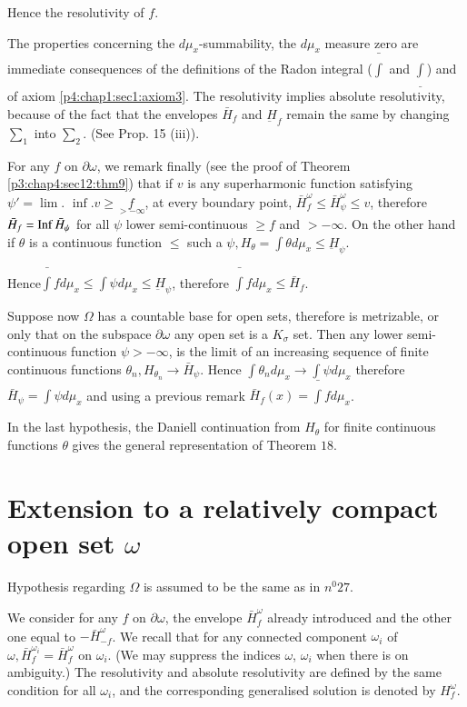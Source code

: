 Hence the resolutivity of $f$.

The properties concerning the $d \mu _x$-summability, the $d \mu_x$
measure zero are immediate consequences of the definitions of the
Radon integral ($\bar{\int}$ and $\underline\int$) and of axiom
\ref{p4:chap1:sec1:axiom3}. The resolutivity implies absolute resolutivity, because of the
fact that the envelopes $\bar{H}_f$ and $\underbar{H}_f$ remain the
same by changing $\sum_1$ into $\sum_2$. (See Prop. 15 (iii)). 

For any $f$ on $\partial \omega$, we remark finally (see the proof of
Theorem \ref{p3:chap4:sec12:thm9}) that if $v$ is any superharmonic function satisfying
$\psi' = \lim$. $\inf. v \geq  \underset{> - \infty}f$, at every
boundary point, $\bar{H}^\omega_f \leq \bar{H}^\omega_\psi \leq v$,
therefore $\bar{H}_f = \operatorname{Inf}  \bar{H}_\psi$ for all $\psi$ lower
semi-continuous $\geq f$ and $> - \infty$. On the other hand if
$\theta$ is a continuous function $\leq$ such a $\psi,  H_\theta =
\int \theta d \mu_x \leq \underbar{H}_\psi$. 

Hence\pageoriginale $\bar{\int}f d \mu_x \leq \int \psi d \mu_x \leq
\underbar{H}_\psi$, therefore $\bar{\int} f d \mu_x \leq \bar{H}_f$. 

Suppose now $\Omega$ has a countable base for open sets, therefore is
metrizable, or only that on the subspace $\partial \omega$ any open
set is a $K_\sigma$ set. Then any lower semi-continuous function $\psi
> -\infty$, is the limit of an increasing sequence of finite continuous
functions $\theta_n,  H_{\theta_n} \to \bar{H}_\psi$. Hence $\int
\theta_n d \mu_x \to \int \psi d \mu_x$ therefore $\bar{H}_\psi = \int
\psi d \mu_x$ and using a previous remark $\bar{H}_f (x) = \bar{\int}f
d \mu_x$. 

In the last hypothesis, the Daniell continuation from $H_\theta$ for
finite continuous functions $\theta$ gives the general representation
of Theorem $18$. 

\section{Extension to a relatively compact open set \texorpdfstring{$\omega$}{omega}}\label{p4:chap6:sec28} %
 

Hypothesis regarding $\Omega$ is assumed to be the same as in $n^0 27$.

We consider for any $f$ on $\partial \omega$, the envelope
$\bar{H}^\omega_f$ already introduced and the other one equal to $-
\bar{H}^\omega_{-f}$. We recall that for any connected component
$\omega_i$ of $\omega, \bar{H}^{\omega_i}_f = \bar{H}^\omega_f$ on
$\omega_i$. (We may suppress the indices $\omega$, $\omega_i$ when
there is on ambiguity.) The resolutivity and absolute resolutivity are
defined by the same condition for all $\omega_i$, and the
corresponding generalised solution is denoted by $H^\omega_f$. 

